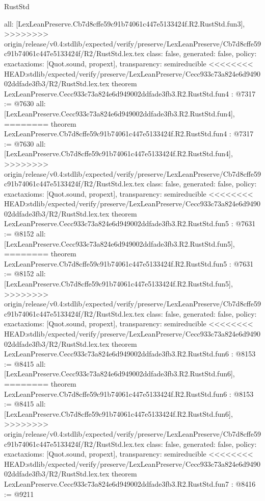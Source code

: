 \begin{lexlean}{RustStd}
\begin{coremodule}
{\begin{coremodule}
{{{{{{{  all: [LexLeanPreserve.Cb7d8cffe59c91b74061c447e5133424f.R2.RustStd.fun3],
>>>>>>>> origin/release/v0.4:stdlib/expected/verify/preserve/LexLeanPreserve/Cb7d8cffe59c91b74061c447e5133424f/R2/RustStd.lex.tex
  class: false,
  generated: false,
  policy: exact{axioms: [Quot.sound, propext]},
  transparency: semireducible
}
<<<<<<<< HEAD:stdlib/expected/verify/preserve/LexLeanPreserve/Cecc933c73a824e6d949002ddfade3fb3/R2/RustStd.lex.tex
theorem LexLeanPreserve.Cecc933c73a824e6d949002ddfade3fb3.R2.RustStd.fun4 : @7317 := @7630 {
  all: [LexLeanPreserve.Cecc933c73a824e6d949002ddfade3fb3.R2.RustStd.fun4],
========
theorem LexLeanPreserve.Cb7d8cffe59c91b74061c447e5133424f.R2.RustStd.fun4 : @7317 := @7630 {
  all: [LexLeanPreserve.Cb7d8cffe59c91b74061c447e5133424f.R2.RustStd.fun4],
>>>>>>>> origin/release/v0.4:stdlib/expected/verify/preserve/LexLeanPreserve/Cb7d8cffe59c91b74061c447e5133424f/R2/RustStd.lex.tex
  class: false,
  generated: false,
  policy: exact{axioms: [Quot.sound, propext]},
  transparency: semireducible
}
<<<<<<<< HEAD:stdlib/expected/verify/preserve/LexLeanPreserve/Cecc933c73a824e6d949002ddfade3fb3/R2/RustStd.lex.tex
theorem LexLeanPreserve.Cecc933c73a824e6d949002ddfade3fb3.R2.RustStd.fun5 : @7631 := @8152 {
  all: [LexLeanPreserve.Cecc933c73a824e6d949002ddfade3fb3.R2.RustStd.fun5],
========
theorem LexLeanPreserve.Cb7d8cffe59c91b74061c447e5133424f.R2.RustStd.fun5 : @7631 := @8152 {
  all: [LexLeanPreserve.Cb7d8cffe59c91b74061c447e5133424f.R2.RustStd.fun5],
>>>>>>>> origin/release/v0.4:stdlib/expected/verify/preserve/LexLeanPreserve/Cb7d8cffe59c91b74061c447e5133424f/R2/RustStd.lex.tex
  class: false,
  generated: false,
  policy: exact{axioms: [Quot.sound, propext]},
  transparency: semireducible
}
<<<<<<<< HEAD:stdlib/expected/verify/preserve/LexLeanPreserve/Cecc933c73a824e6d949002ddfade3fb3/R2/RustStd.lex.tex
theorem LexLeanPreserve.Cecc933c73a824e6d949002ddfade3fb3.R2.RustStd.fun6 : @8153 := @8415 {
  all: [LexLeanPreserve.Cecc933c73a824e6d949002ddfade3fb3.R2.RustStd.fun6],
========
theorem LexLeanPreserve.Cb7d8cffe59c91b74061c447e5133424f.R2.RustStd.fun6 : @8153 := @8415 {
  all: [LexLeanPreserve.Cb7d8cffe59c91b74061c447e5133424f.R2.RustStd.fun6],
>>>>>>>> origin/release/v0.4:stdlib/expected/verify/preserve/LexLeanPreserve/Cb7d8cffe59c91b74061c447e5133424f/R2/RustStd.lex.tex
  class: false,
  generated: false,
  policy: exact{axioms: [Quot.sound, propext]},
  transparency: semireducible
}
<<<<<<<< HEAD:stdlib/expected/verify/preserve/LexLeanPreserve/Cecc933c73a824e6d949002ddfade3fb3/R2/RustStd.lex.tex
theorem LexLeanPreserve.Cecc933c73a824e6d949002ddfade3fb3.R2.RustStd.fun7 : @8416 := @9211 {
}}}}}}}}}}
\end{coremodule}}
\end{coremodule}
\end{lexlean}
